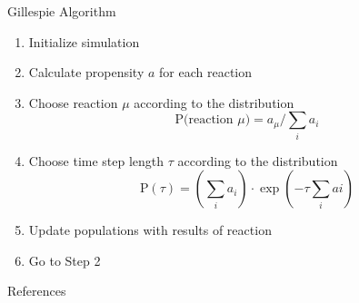 \documentclass[10pt, notes]{beamer}       %
\begin{document}
\begin{frame}{Gillespie Algorithm }
  \begin{enumerate}
    \item Initialize simulation
    \item Calculate propensity $a$ for each reaction
    \item Choose reaction $\mu$ according to the distribution
      $$\text{P(reaction }\mu) = a_\mu / \sum_{i}a_i$$ %
    \item Choose time step length $\tau$ according to the distribution
      $$\text{P}(\tau)=\left(\sum_i a_i\right) \cdot \exp{\left(-\tau \sum_i ai\right)}$$
    \item Update populations with results of reaction
    \item Go to Step 2
  \end{enumerate}
\end{frame}

\begin{frame}[allowframebreaks]{References}
\end{frame}
\end{document}
